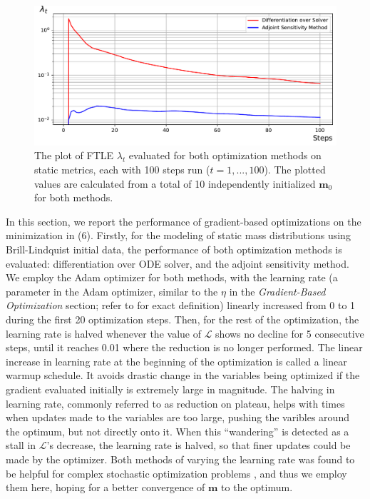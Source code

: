 \documentclass[conference]{IEEEtran}
\begin{document}
\begin{figure}[htbp]
\centerline{\includegraphics[width=\columnwidth]{FTLE.pdf}}
\caption{The plot of FTLE $\lambda_t$ evaluated for both optimization methods on static metrics, 
each with 100 steps run ($t=1, ..., 100$).
The plotted values are calculated from a total of 10 independently 
initialized $\mathbf{m}_0$ for both methods.}
\label{fig}
\end{figure}


In this section, we report the performance of gradient-based optimizations 
on the minimization in (6). Firstly, for the modeling of static 
mass distributions using Brill-Lindquist initial data, the performance of both 
optimization methods is evaluated: differentiation over ODE solver, and the
adjoint sensitivity method. We employ the Adam optimizer for both methods, 
with the learning rate (a parameter in the Adam optimizer, similar to the $\eta$ 
in the \textit{Gradient-Based Optimization} section; refer to \cite{Adam} for exact definition) 
linearly increased from 0 to 1 during the first 20 optimization steps. Then, 
for the rest of the optimization, the learning rate is halved whenever the 
value of $\mathcal{L}$ shows no decline for 5 consecutive steps, until it 
reaches 0.01 where the reduction is no longer performed. The linear 
increase in learning rate at the beginning of the optimization is called a 
linear warmup schedule. It avoids drastic change in the variables being 
optimized if the gradient evaluated initially is extremely 
large in magnitude. The halving in learning rate, commonly referred to 
as reduction on plateau, helps with times when updates made to the 
variables are too large, pushing the varibles around the optimum, 
but not directly onto it. When this “wandering” is detected as a 
stall in $\mathcal{L}$’s decrease, the learning rate is halved, so that 
finer updates could be made by the optimizer. Both methods of varying 
the learning rate was found to be helpful for complex stochastic 
optimization problems \cite{resnet}\cite{Transformer}, and thus we employ them here, hoping for a 
better convergence of $\mathbf{m}$ to the optimum. 
\end{document}
